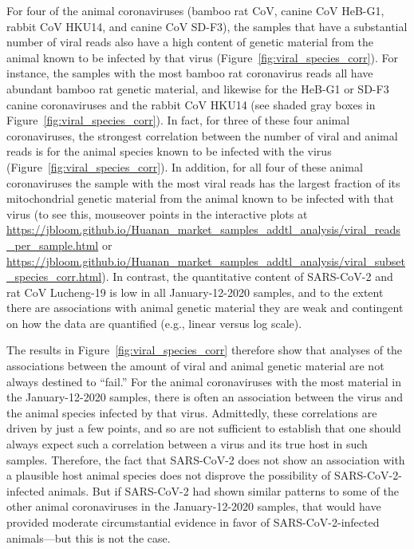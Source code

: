 \documentclass[9pt,twocolumn,twoside]{gsajnl_modified}
\begin{document}
For four of the animal coronaviruses (bamboo rat CoV, canine CoV HeB-G1, rabbit CoV HKU14, and canine CoV SD-F3), the samples that have a substantial number of viral reads also have a high content of genetic material from the animal known to be infected by that virus (Figure~\ref{fig:viral_species_corr}).
For instance, the samples with the most bamboo rat coronavirus reads all have abundant bamboo rat genetic material, and likewise for the HeB-G1 or SD-F3 canine coronaviruses and the rabbit CoV HKU14 (see shaded gray boxes in Figure~\ref{fig:viral_species_corr}).
In fact, for three of these four animal coronaviruses, the strongest correlation between the number of viral and animal reads is for the animal species known to be infected with the virus (Figure~\ref{fig:viral_species_corr}).
In addition, for all four of these animal coronaviruses the sample with the most viral reads has the largest fraction of its mitochondrial genetic material from the animal known to be infected with that virus (to see this, mouseover points in the interactive plots at \url{https://jbloom.github.io/Huanan_market_samples_addtl_analysis/viral_reads_per_sample.html} or \url{https://jbloom.github.io/Huanan_market_samples_addtl_analysis/viral_subset_species_corr.html}).
In contrast, the quantitative content of SARS-CoV-2 and rat CoV Lucheng-19 is low in all January-12-2020 samples, and to the extent there are associations with animal genetic material they are weak and contingent on how the data are quantified (e.g., linear versus log scale).

The results in Figure~\ref{fig:viral_species_corr} therefore show that analyses of the associations between the amount of viral and animal genetic material are not always destined to ``fail.''
For the animal coronaviruses with the most material in the January-12-2020 samples, there is often an association between the virus and the animal species infected by that virus.
Admittedly, these correlations are driven by just a few points, and so are not sufficient to establish that one should always expect such a correlation between a virus and its true host in such samples.
Therefore, the fact that SARS-CoV-2 does not show an association with a plausible host animal species does not disprove the possibility of SARS-CoV-2-infected animals.
But if SARS-CoV-2 had shown similar patterns to some of the other animal coronaviruses in the January-12-2020 samples, that would have provided moderate circumstantial evidence in favor of SARS-CoV-2-infected animals---but this is not the case.
\end{document}

